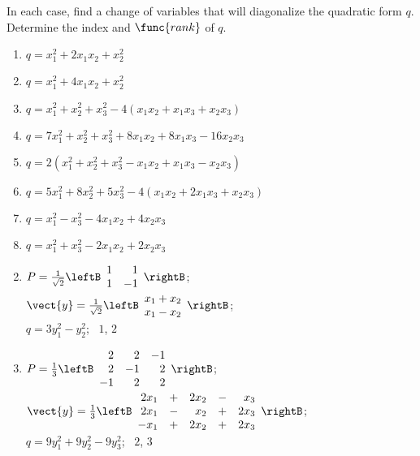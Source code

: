 \begin{multicols}{2}
\begin{ex}
In each case, find a change of variables that will diagonalize the quadratic form $q$. Determine the index and $\func{rank}$ of $q$.


\begin{enumerate}[label={\alph*.}]
\item $q = x_{1}^2 + 2x_{1}x_{2} + x_{2}^2$

\item $q = x_{1}^2 + 4x_{1}x_{2} + x_{2}^2$

\item $q = x_{1}^2 + x_{2}^2 + x_{3}^2 - 4(x_{1}x_{2} + x_{1}x_{3} + x_{2}x_{3})$

\item $q = 7x_{1}^2 + x_{2}^2 + x_{3}^2 + 8x_{1}x_{2} + 8x_{1}x_{3} - 16x_{2}x_{3}$

\item $q = 2(x_{1}^2 + x_{2}^2 + x_{3}^2 - x_{1}x_{2} + x_{1}x_{3} - x_{2}x_{3})$

\item $q = 5x_{1}^2 + 8x_{2}^2 + 5x_{3}^2 - 4(x_{1}x_{2} + 2x_{1}x_{3} + x_{2}x_{3})$

\item $q = x_{1}^2 - x_{3}^2 - 4x_{1}x_{2} + 4x_{2}x_{3}$

\item $q = x_{1}^2 + x_{3}^2 - 2x_{1}x_{2} + 2x_{2}x_{3}$


\end{enumerate}
\begin{sol}
\begin{enumerate}[label={\alph*.}]
\setcounter{enumi}{1}
\item $P = \frac{1}{\sqrt{2}}\leftB \begin{array}{rr}
1 & 1 \\
1 & -1
\end{array}\rightB$; \\
$\vect{y} = \frac{1}{\sqrt{2}}\leftB \begin{array}{r}
x_{1} + x_{2} \\
x_{1} - x_{2}
\end{array}\rightB$; \\
$q = 3y_{1}^2 - y_{2}^2$; \ $1$, $2$

\setcounter{enumi}{3}
\item $P = \frac{1}{3}\leftB \begin{array}{rrr}
2 & 2 & -1 \\
2 & -1 & 2 \\
-1 & 2 & 2
\end{array}\rightB$;  \\
$\vect{y} = \frac{1}{3}\leftB \begin{array}{rcrcr}
2x_{1} & + & 2x_{2} & - & x_{3} \\
2x_{1} & - & x_{2} & + & 2x_{3} \\
-x_{1} & + & 2x_{2} & + & 2x_{3} 
\end{array}\rightB$; \\
$q = 9y_{1}^2 + 9y_{2}^2 - 9y_{3}^2$; \ $2$, $3$


\end{enumerate}
\end{sol}
\end{ex}
\end{multicols}
